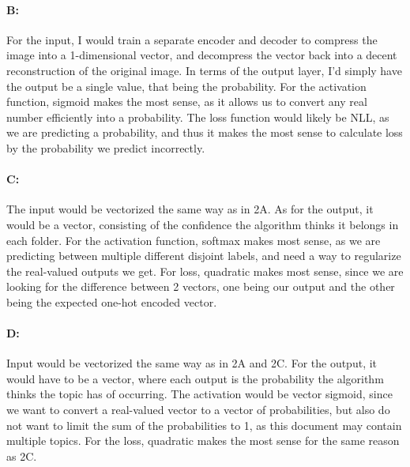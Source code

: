 \documentclass{article}
\begin{document}
\paragraph{B: } For the input, I would train a separate encoder and decoder to compress the image into a 1-dimensional vector, and decompress the vector back into a decent reconstruction of the original image. In terms of the output layer, I'd simply have the output be a single value, that being the probability. For the activation function, sigmoid makes the most sense, as it allows us to convert any real number efficiently into a probability. The loss function would likely be NLL, as we are predicting a probability, and thus it makes the most sense to calculate loss by the probability we predict incorrectly.

\paragraph{C: } The input would be vectorized the same way as in 2A. As for the output, it would be a vector, consisting of the confidence the algorithm thinks it belongs in each folder. For the activation function, softmax makes most sense, as we are predicting between multiple different disjoint labels, and need a way to regularize the real-valued outputs we get. For loss, quadratic makes most sense, since we are looking for the difference between 2 vectors, one being our output and the other being the expected one-hot encoded vector.

\paragraph{D: } Input would be vectorized the same way as in 2A and 2C. For the output, it would have to be a vector, where each output is the probability the algorithm thinks the topic has of occurring. The activation would be vector sigmoid, since we want to convert a real-valued vector to a vector of probabilities, but also do not want to limit the sum of the probabilities to 1, as this document may contain multiple topics. For the loss, quadratic makes the most sense for the same reason as 2C.
\end{document}
